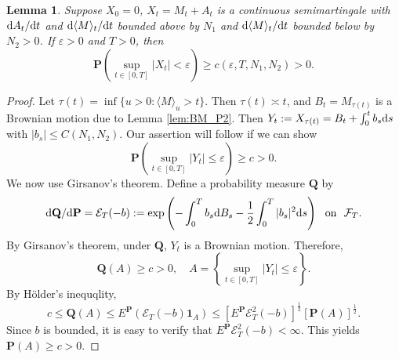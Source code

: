 \documentclass[twoside, 12pt]{book}
\numberwithin{equation}{chapter}
\newtheorem{lemma}[theorem]{Lemma}
\def\cE{{\mathcal E}}
\def\cF{{\mathcal F}}
\def\bP{{\mathbf P}}
\def\bQ{{\mathbf Q}}
\def\l{\left}
\def\r{\right}
\def\<{\langle}
\def\>{\rangle}
\def\geq{\geqslant}
\def\leq{\leqslant}
\def\1{{\mathbf{1}}}
\def\d{\text{\rm{d}}}
\def\eps{\varepsilon}
\begin{document}
	\begin{lemma}\label{lem:support-mart}
		Suppose $X_0=0$, $X_t=M_t+A_t$ is a continuous semimartingale with $\d A_t / \d t$ and $\d\langle M\rangle_t / \d t$ bounded above by $N_1$ and $\d\langle M\rangle_t / \d t$ bounded below by $N_2>0$. If $\varepsilon>0$ and $T>0$, then
		$$
		\bP \left(\sup _{t\in [0,T]}\left|X_t\right|<\varepsilon\right) \geq c(\eps, T, N_1, N_2)>0. 
		$$
	\end{lemma}
	\begin{proof}
		Let $\tau(t)=\inf\{u>0: \<M\>_u>t\}$. Then $\tau(t)\asymp t$, and $B_t=M_{\tau(t)}$ is a Brownian motion due to Lemma \ref{lem:BM_P2}. Then $Y_t:= X_{\tau(t)}=B_t+ \int_0^t b_s \d s$ with $|b_s|\leq C(N_1, N_2)$. Our assertion will follow if we can show 
		\[
		\bP \l( \sup_{t\in [0,T]} |Y_t| \leq \eps \r)\geq c>0. 
		\]
		We now use Girsanov’s theorem. Define a probability measure $\bQ$ by 
		\[
		\d \bQ/ \d \bP = \cE_T(-b):= \exp \l( - \int_0^T b_s \d B_s-\frac{1}{2} \int_0^T |b_s|^2 \d s \r) ~\mbox{ on } ~ \cF_{T}. 
		\]
		By Girsanov’s theorem, under $\bQ$, $Y_t$ is a Brownian motion. Therefore, 
		\[
		\bQ \l( A \r)\geq c>0, \quad A= \l\{\sup_{t\in [0,T]} |Y_t| \leq \eps\r\}.  
		\]
		By Hölder's inequqlity, 
		\[
		c\leq \bQ(A) \leq E^{\bP} (\cE_T(-b) \1_A)\leq  [E^{\bP} \cE_T^2(-b)]^{\frac{1}{2}} [\bP(A)]^{\frac{1}{2}}.
		\]
		Since $b$ is bounded, it is easy to verify that $E^{\bP} \cE_T^2(-b)<\infty$. This yields $\bP(A)\geq c>0$. 
	\end{proof}
	
\end{document}
